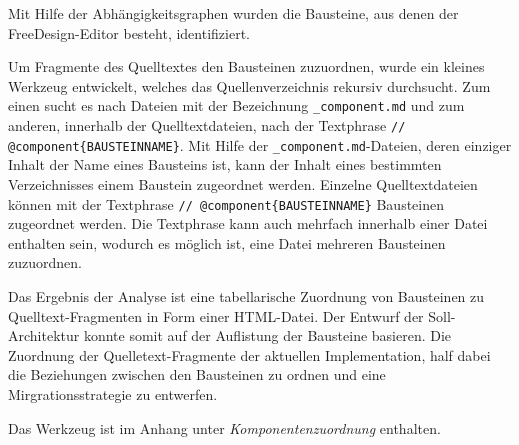 Mit Hilfe der Abhängigkeitsgraphen wurden die Bausteine, aus denen der FreeDesign-Editor besteht, identifiziert. 

Um Fragmente des Quelltextes den Bausteinen zuzuordnen, wurde ein kleines Werkzeug entwickelt, welches das Quellenverzeichnis rekursiv durchsucht. Zum einen sucht es nach Dateien mit der Bezeichnung \glqq\lstinline|_component.md|\grqq{} und zum anderen, innerhalb der Quelltextdateien, nach der Textphrase \glqq\lstinline|// @component{BAUSTEINNAME}|\grqq{}. 
Mit Hilfe der \lstinline|_component.md|-Dateien, deren einziger Inhalt der Name eines Bausteins ist, kann der Inhalt eines bestimmten Verzeichnisses einem Baustein zugeordnet werden. Einzelne Quelltextdateien können mit der Textphrase \glqq\lstinline|// @component{BAUSTEINNAME}|\grqq{} Bausteinen zugeordnet werden. Die Textphrase kann auch mehrfach innerhalb einer Datei enthalten sein, wodurch es möglich ist, eine Datei mehreren Bausteinen zuzuordnen. 

Das Ergebnis der Analyse ist eine tabellarische Zuordnung von Bausteinen zu Quelltext-Fragmenten in Form einer HTML-Datei. 
Der Entwurf der Soll-Architektur konnte somit auf der Auflistung der Bausteine basieren. Die Zuordnung der Quelletext-Fragmente der aktuellen Implementation, half dabei die Beziehungen zwischen den Bausteinen zu ordnen und eine Mirgrationsstrategie zu entwerfen.

Das Werkzeug ist im Anhang unter \emph{Komponentenzuordnung} enthalten.